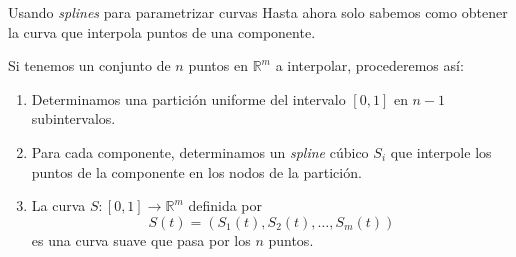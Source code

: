 \begin{frame}{Usando \textit{splines} para parametrizar curvas}
  Hasta ahora solo sabemos como obtener la curva que interpola
  puntos de \alert{una componente}.

  Si tenemos un conjunto de $n$ puntos en $\mathbb{R}^m$ a interpolar,
  procederemos así:
  \begin{enumerate}
    \item Determinamos una partición uniforme del intervalo $[0, 1]$ en
    $n - 1$ subintervalos.
    \item Para cada componente, determinamos un \textit{spline} cúbico
    $S_i$ que interpole los puntos de la componente en los nodos de la
    partición.
    \item La curva $S: [0, 1] \longrightarrow \mathbb{R}^m$ definida por
    \[
      S(t) = \left(S_1(t), S_2(t), \ldots, S_m(t)\right)
    \]
    es una curva suave que pasa por los $n$ puntos.
  \end{enumerate}
\end{frame}
